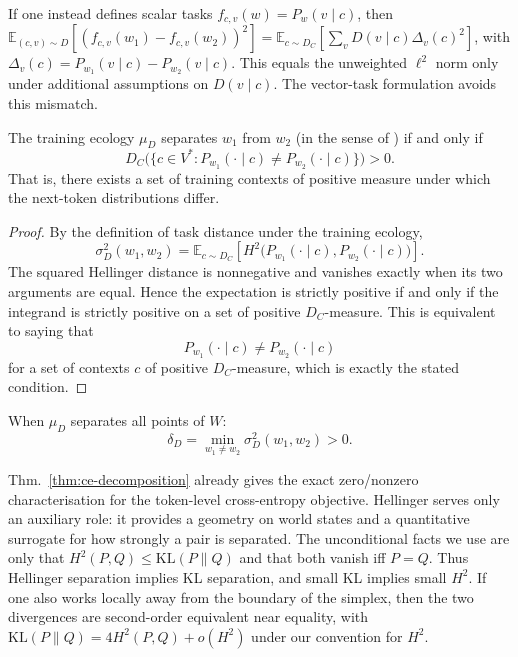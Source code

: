 \documentclass[twoside,11pt]{article}
\newcommand{\sigmasq}{\sigma^2}
\newcommand{\E}{\mathbb{E}}
\newcommand{\KL}{\mathrm{KL}}
\newcommand{\Hsq}{H^2}
\newcommand{\thmref}[1]{Thm.~\ref{#1}}
\begin{document}
\begin{remark}
If one instead defines scalar tasks $f_{c,v}(w)=P_w(v\mid c)$, then $\E_{(c,v)\sim D}[(f_{c,v}(w_1)-f_{c,v}(w_2))^2] = \E_{c\sim D_C}\!\left[\sum_v D(v\mid c)\Delta_v(c)^2\right]$, with $\Delta_v(c)=P_{w_1}(v\mid c)-P_{w_2}(v\mid c)$. This equals the unweighted $\ell^2$ norm only under additional assumptions on $D(v\mid c)$. The vector-task formulation avoids this mismatch.
\end{remark}

\begin{corollary}\label{cor:text-separation}
The training ecology $\mu_D$ separates $w_1$ from $w_2$ (in the sense of \citet[Definition~3.3]{dallariva_2026}) if and only if
\[
D_C\bigl(\{c \in V^* : P_{w_1}(\cdot\mid c) \neq P_{w_2}(\cdot\mid c)\}\bigr) > 0.
\]
That is, there exists a set of training contexts of positive measure under which the next-token distributions differ.
\end{corollary}

\begin{proof}
By the definition of task distance under the training ecology,
\[
\sigmasq_D(w_1,w_2)
= \E_{c\sim D_C}\!\left[\Hsq\bigl(P_{w_1}(\cdot\mid c),P_{w_2}(\cdot\mid c)\bigr)\right].
\]
The squared Hellinger distance is nonnegative and vanishes exactly when its two arguments are equal. Hence the expectation is strictly positive if and only if the integrand is strictly positive on a set of positive $D_C$-measure. This is equivalent to saying that
\[
P_{w_1}(\cdot\mid c)\neq P_{w_2}(\cdot\mid c)
\]
for a set of contexts $c$ of positive $D_C$-measure, which is exactly the stated condition.
\end{proof}

\begin{definition}\label{def:text-margin}
When $\mu_D$ separates all points of $W$:
\[
\delta_D = \min_{w_1 \neq w_2} \sigmasq_D(w_1, w_2) > 0.
\]
\end{definition}

\begin{remark}
\thmref{thm:ce-decomposition} already gives the exact zero/nonzero characterisation for the token-level cross-entropy objective. Hellinger serves only an auxiliary role: it provides a geometry on world states and a quantitative surrogate for how strongly a pair is separated. The unconditional facts we use are only that $\Hsq(P,Q) \le \KL(P \| Q)$ and that both vanish iff $P=Q$. Thus Hellinger separation implies KL separation, and small KL implies small $\Hsq$. If one also works locally away from the boundary of the simplex, then the two divergences are second-order equivalent near equality, with $\KL(P\|Q)=4\Hsq(P,Q)+o(\Hsq)$ under our convention for $\Hsq$.
\end{remark}
\end{document}
